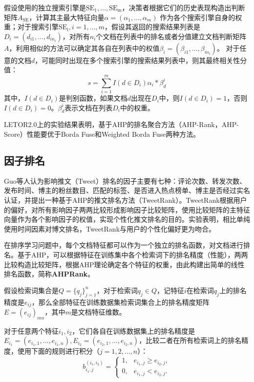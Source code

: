 假设使用的独立搜索引擎是$\mathrm{SE_1},\ldots, \mathrm{SE_m}$，决策者根据它们的历史表现构造出判断矩阵$A_{\mathrm{SE}}$，计算其主最大特征向量$\alpha = (\alpha_1,\ldots, \alpha_m)$ 作为各个搜索引擎自身的权重；对于搜索引擎$\mathrm{SE_i}, i=1,\ldots, m$，假设其返回的搜索结果列表是$D_i = (d_{i1},\ldots, d_{in_i})$，对所有$n_i$个文档在列表中的排名或者分值建立文档判断矩阵$A$，利用相似的方法可以确定其各自在列表中的权值$\beta_i = (\beta_{i1},\ldots,\beta_{in_i})$。 对于任意的文档$d$，可能同时出现在多个搜索引擎的搜索结果列表中，则其最终相关性分值：
\begin{equation}
  s = \sum\limits_{i=1}^m I(d\in D_i) \alpha_i * \beta_d^i
\end{equation}
其中，$I(d\in D_i)$是判别函数，如果文档$d$出现在$D_i$中，则$I(d\in D_i) = 1$，否则$I(d\in D_i) = 0$。$\beta_d^i$表示文档在列表$D_i$中的权重。

LETOR2.0上的实验结果表明，基于AHP的排名聚合方法（AHP-Rank，AHP-Score）性能要优于Borda Fuse和Weighted Borda Fuse两种方法。

\subsection{因子排名}
Guo等人\cite{guo2012personalized}认为影响推文（Tweet）排名的因子主要有七种：评论次数、转发次数、发布时间、博主的粉丝数目、匹配的标签、是否进入热点榜单、博主是否经过实名认证，并提出一种基于AHP的推文排名方法（TweetRank）。TweetRank根据用户的偏好，对所有影响因子两两比较形成影响因子比较矩阵，使用比较矩阵的主特征向量作为各个影响因子的权值，实现个性化推文排名的目的。实验表明，相比单纯使用时间因素对博文排名，TweetRank与用户的个性化偏好更为吻合。

在排序学习问题中，每个文档特征都可以作为一个独立的排名函数，对文档进行排名。基于AHP，可以根据特征在训练集中各个检索词下的排名精度（性能），两两比较构造比较矩阵，根据AHP理论确定各个特征的权重，由此构建出简单的线性排名函数，简称\textbf{AHPRank}。

假设检索词集合是$Q = \{q_j\}_{j=1}^n$，对于检索词$q_j\in Q$，记特征$i$在检索词$q_j$上的排名精度是$e_{ij}$，那么全部特征在训练数据集检索词集合上的排名精度矩阵$E = (e_{ij})_{mn}$，其中$m$是文档特征维数。

对于任意两个特征$i_1,i_2$，它们各自在训练数据集上的排名精度是$E_{i_1} = (e_{i_1,1},\ldots, e_{i_1,n}), E_{i_2} = (e_{i_2,1},\ldots, e_{i_2,n})$，比较二者在所有检索词上的排名精度，使用下面的规则进行积分（$j = 1,2,\ldots, n$）：
\begin{equation}\label{eq:rating}
  b_{i_1, j}^{(i_1,i_2)} =
  \left\{
    \begin{array}{ll}
      1, & e_{i_1,j} \ge e_{i_2,j}, \\
      0, & e_{i_1,j} < e_{i_2,j}.
    \end{array}
  \right.
\end{equation}

